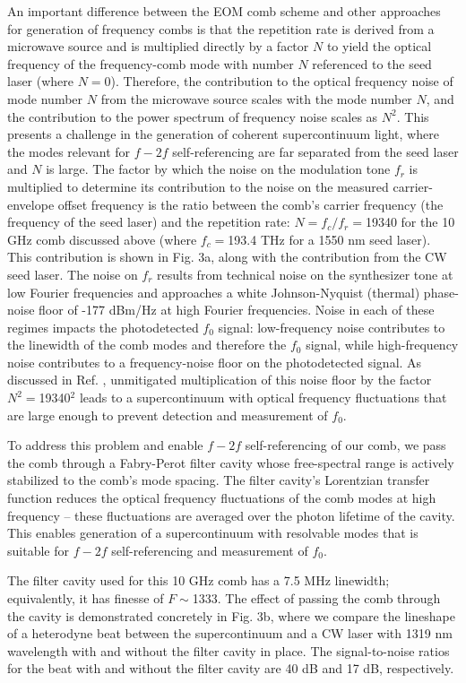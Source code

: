 An important difference between the EOM comb scheme and other approaches for generation of frequency combs is that the repetition rate is derived from a microwave source and is multiplied directly by a factor $N$ to yield the optical frequency of the frequency-comb mode with number $N$ referenced to the seed laser (where $N=0$). Therefore, the contribution to the optical frequency noise of mode number $N$ from the microwave source scales with the mode number $N$, and the contribution to the power spectrum of frequency noise scales as $N^2$. This presents a challenge in the generation of coherent supercontinuum light, where the modes relevant for $f-2f$ self-referencing are far separated from the seed laser and $N$ is large. The factor by which the noise on the modulation tone $f_r$ is multiplied to determine its contribution to the noise on the measured carrier-envelope offset frequency is the ratio between the comb’s carrier frequency (the frequency of the seed laser) and the repetition rate: $N=f_c/f_r=$19340 for the 10 GHz comb discussed above (where $f_c=$193.4 THz for a 1550 nm seed laser). This contribution is shown in Fig. 3a, along with the contribution from the CW seed laser. The noise on $f_r$ results from technical noise on the synthesizer tone at low Fourier frequencies and approaches a white Johnson-Nyquist (thermal) phase-noise floor of -177 dBm/Hz at high Fourier frequencies. Noise in each of these regimes impacts the photodetected $f_0$ signal: low-frequency noise contributes to the linewidth of the comb modes and therefore the $f_0$ signal, while high-frequency noise contributes to a frequency-noise floor on the photodetected signal\cite{DiDomenico2010}. As discussed in Ref. \cite{Beha2017}, unmitigated multiplication of this noise floor by the factor $N^2=$19340$^2$ leads to a supercontinuum with optical frequency fluctuations that are large enough to prevent detection and measurement of $f_0$. 

To address this problem and enable $f-2f$ self-referencing of our comb, we pass the comb through a Fabry-Perot filter cavity whose free-spectral range is actively stabilized to the comb’s mode spacing. The filter cavity’s Lorentzian transfer function reduces the optical frequency fluctuations of the comb modes at high frequency – these fluctuations are averaged over the photon lifetime of the cavity. This enables generation of a supercontinuum with resolvable modes that is suitable for $f-2f$ self-referencing and measurement of $f_0$. 

The filter cavity used for this 10 GHz comb has a 7.5 MHz linewidth; equivalently, it has finesse of $F\sim$1333. The effect of passing the comb through the cavity is demonstrated concretely in Fig. 3b, where we compare the lineshape of a heterodyne beat between the supercontinuum and a CW laser with 1319 nm wavelength with and without the filter cavity in place. The signal-to-noise ratios for the beat with and without the filter cavity are 40 dB and 17 dB, respectively.


